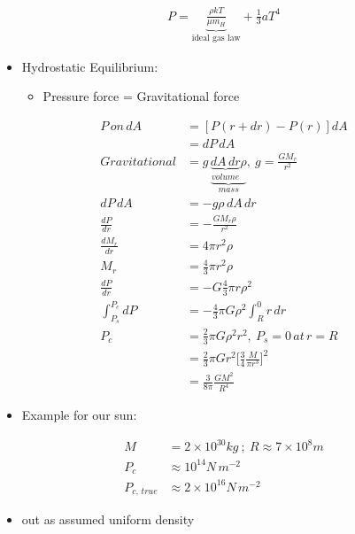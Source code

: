 \documentclass[a4paper,11pt,normalem]{article}
\begin{document}
\section{}
\begin{align*}
    P = \underbrace{\frac{\rho kT}{\mu m_H}}_{\text{ideal gas law}} + \frac{1}{3}aT^4
\end{align*}
\begin{itemize}
    \item Hydrostatic Equilibrium:
        \begin{itemize}
            \item Pressure force = Gravitational force
        \end{itemize}
\end{itemize}
\begin{align*}
    P\,on\,dA &= [P(r + dr) - P(r)]dA \\
    &= dP\,dA \\
    Gravitational &= g\,\underbrace{\underbrace{dA\, dr}_{volume} \rho}_{mass},~ g = \frac{GM_r}{r^2} \\
    dP\,dA &= -g\rho\, dA\, dr \\
    \frac{dP}{dr} &= -\frac{GM_r \rho}{r^2} \\
    \frac{dM_r}{dr} &= 4\pi r^2 \rho \\
    M_r &= \frac{4}{3}\pi r^2 \rho \\
    \frac{dP}{dr} &= -G \frac{4}{3}\pi r \rho^2 \\
    \int_{P_s}^{P_c} dP &= -\frac{4}{3}\pi G \rho^2 \int_{R}^{0} r\,dr \\
    P_c &= \frac{2}{3}\pi G \rho^2 r^2,~ P_s = 0 \,at\, r = R\\
    &= \frac{2}{3}\pi Gr^2 \Big[\frac{3}{4}\frac{M}{\pi r^3}\Big]^2 \\
    &= \frac{3}{8\pi}\frac{GM^2}{R^4}
\end{align*}
\begin{itemize}
    \item Example for our sun:
\end{itemize}
\begin{align*}
    M &= 2\times10^{30} kg ~;~ R \approx 7\times10^8 m \\
    P_c &\approx 10^{14} N\,m^{-2} \\
    P_{c,\, true} &\approx 2\times10^{16} N\,m^{-2}
\end{align*}

\begin{itemize}
    \item out as assumed uniform density
\end{itemize}
\end{document}
